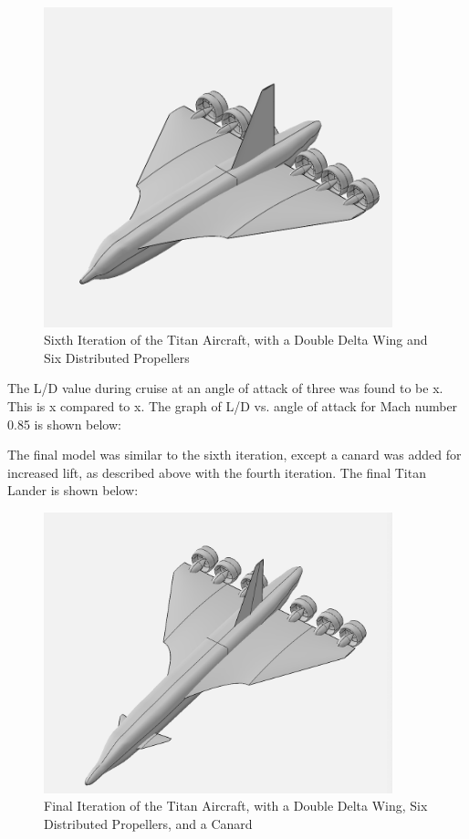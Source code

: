 \documentclass{article}
\begin{document}
\begin{figure}[H]
    \centering
    \includegraphics[width = 0.90\textwidth]{Figures/TitanLanderv11.png}
    \caption{Sixth Iteration of the Titan Aircraft, with a Double Delta Wing and Six Distributed Propellers}
    \label{fig:TitanLanderv11}
\end{figure}


The L/D value during cruise at an angle of attack of three was found to be x. This is x compared to x. The graph of L/D vs. angle of attack for Mach number 0.85 is shown below: 


The final model was similar to the sixth iteration, except a canard was added for increased lift, as described above with the fourth iteration. The final Titan Lander is shown below: 

\begin{figure}[H]
    \centering
    \includegraphics[width = 0.90\textwidth]{Figures/TitanLanderv13.png}
    \caption{Final Iteration of the Titan Aircraft, with a Double Delta Wing, Six Distributed Propellers, and a Canard}
    \label{fig:TitanLanderv13}
\end{figure}
\end{document}
